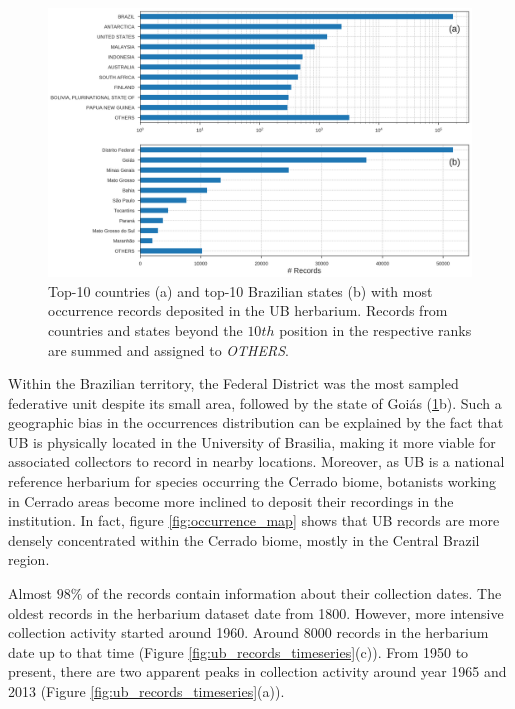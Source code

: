   \begin{figure}[!htb]
  	\centering
    \includegraphics[width=\linewidth]{figures/recs_by_cntry_state.png}
    \caption{Top-10 countries (a) and top-10 Brazilian states (b) with most occurrence records deposited in the UB herbarium. Records from countries and states beyond the $10th$ position in the respective ranks are summed and assigned to \textit{OTHERS}.}
    \label{fig:recs_by_cntry_state}
  \end{figure}
  
Within the Brazilian territory, the Federal District was the most sampled federative unit despite its small area, followed by the state of Goiás (\ref{fig:recs_by_cntry_state}b). 
Such a geographic bias in the occurrences distribution can be explained by the fact that UB is physically located in the University of Brasilia, making it more viable for associated collectors to record in nearby locations.
Moreover, as UB is a national reference herbarium for species occurring the Cerrado biome, botanists working in Cerrado areas become more inclined to deposit their recordings in the institution.
In fact, figure \ref{fig:occurrence_map} shows that UB records are more densely concentrated within the Cerrado biome, mostly in the Central Brazil region. 


  

Almost $98\%$ of the records contain information about their collection dates.
The oldest records in the herbarium dataset date from 1800.
However, more intensive collection activity started around 1960. Around 8000 records in the herbarium date up to that time (Figure \ref{fig:ub_records_timeseries}(c)). 
From 1950 to present, there are two apparent peaks in collection activity around year 1965 and 2013 (Figure \ref{fig:ub_records_timeseries}(a)). %

